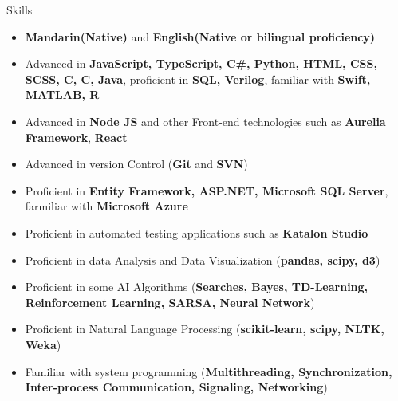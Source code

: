 \documentclass{resume}
\begin{document}
\begin{rSection}{Skills}

\begin{itemize}

    \item   \textbf{Mandarin(Native)} and \textbf{English(Native or bilingual proficiency)}
    \item	Advanced in \textbf{JavaScript, TypeScript, C\#, Python, HTML, CSS, SCSS, C, C\boldsymbol{++}, Java}, proficient in \textbf{SQL, Verilog}, familiar with \textbf{Swift, MATLAB, R}
    \item	Advanced in \textbf{Node JS} and other Front-end technologies such as \textbf{Aurelia Framework}, \textbf{React}
    \item   Advanced in version Control (\textbf{Git} and \textbf{SVN})
    \item	Proficient in \textbf{Entity Framework, ASP.NET, Microsoft SQL Server}, farmiliar with \textbf{Microsoft Azure}
    \item	Proficient in automated testing applications such as \textbf{Katalon Studio}	
    \item   Proficient in data Analysis and Data Visualization (\textbf{pandas, scipy, d3})
    \item	Proficient in some AI Algorithms (\textbf{Searches, Bayes, TD-Learning, Reinforcement Learning, SARSA, Neural Network})
    \item	Proficient in Natural Language Processing (\textbf{scikit-learn, scipy, NLTK, Weka})
    \item	Familiar with system programming (\textbf{Multithreading, Synchronization, Inter-process Communication, Signaling, Networking})

\end{itemize}

\end{rSection}
\end{document}
